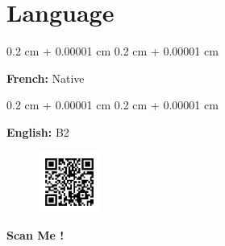 \documentclass[10pt, letterpaper]{article}
\newenvironment{onecolentry}{
    \begin{adjustwidth}{
        0.2 cm + 0.00001 cm
    }{
        0.2 cm + 0.00001 cm
    }
}{
    \end{adjustwidth}
} %
\begin{document}
    \section{Language}
        \begin{onecolentry}
            \textbf{French:} Native
        \end{onecolentry}
        \vspace{0.2 cm}

        \begin{onecolentry}
            \textbf{English:} B2
        \end{onecolentry}
        \vspace{0.2 cm}



    \begin{figure}[th]
        \centering
        \includegraphics[width=2cm, height=2cm]{qr_code_cv.png}
    \end{figure}
    \begin{center}
            \textbf{Scan Me !}
    \end{center}
\end{document}
